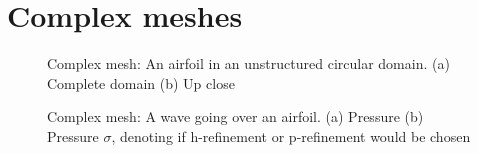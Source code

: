 \section{Complex meshes} \label{section:results:complex_meshes}

\begin{figure}[H]
	\centering
	\hfill
	\caption{Complex mesh: An airfoil in an unstructured circular domain. (a) Complete domain (b) Up close}
	\label{fig:complex_mesh}
\end{figure}

\begin{figure}[H]
	\centering
	\hfill
	\caption{Complex mesh: A wave going over an airfoil. (a) Pressure (b) Pressure $\sigma$, denoting if h-refinement or p-refinement would be chosen}
	\label{fig:complex_mesh_solution}
\end{figure}
